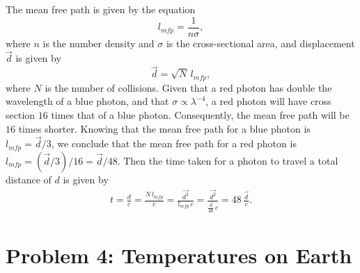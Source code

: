 \documentclass[11pt,letterpaper]{article}
\begin{document}
The mean free path is given by the equation 
\begin{equation*}
    l_{mfp} = \frac{1}{n\sigma},
\end{equation*}
where $n$ is the number density and $\sigma$ is the cross-sectional area, and displacement $\vec{d}$ is given by 
\begin{equation*}
    \vec{d} = \sqrt{N}\,l_{mfp},
\end{equation*}
where $N$ is the number of collisions. Given that a red photon has double the wavelength of a blue photon, and that $\sigma \propto \lambda^{-4}$, a red photon will have cross section $16$ times that of a blue photon. Consequently, the mean free path will be $16$ times shorter. Knowing that the mean free path for a blue photon is $l_{mfp} = \vec{d}/3$, we conclude that the mean free path for a red photon is $l_{mfp} = (\vec{d}/3) / 16 = \vec{d}/48$. Then the time taken for a photon to travel a total distance of $d$ is given by 
\begin{align*}
    t = \frac{d}{c} = \frac{N\,l_{mfp}}{c} = \frac{\vec{d^2}}{l_{mfp}\,c} = \frac{\vec{d^2}}{\frac{\vec{d}}{48}\,c} = 48\,\frac{\vec{d}}{c}.
\end{align*}

\section*{Problem 4: Temperatures on Earth} 
\end{document}
